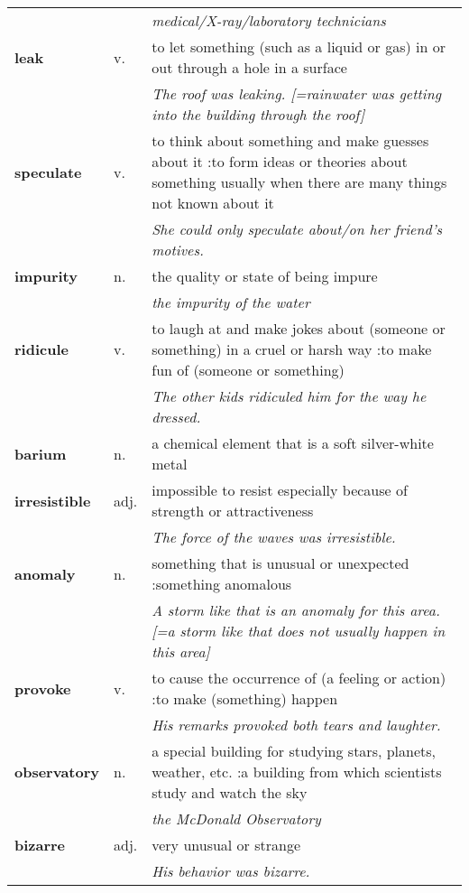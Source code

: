 \documentclass[a4paper]{article}
\begin{document}
\begin{longtable}{llp{11cm}}
 & & \textit{medical/X-ray/laboratory technicians}\\[0.08cm]
\textbf{leak} & v. &  to let something (such as a liquid or gas) in or out through a hole in a surface \\
 & & \textit{The roof was leaking. [=rainwater was getting into the building through the roof]}\\[0.08cm]
\textbf{speculate} & v. &  to think about something and make guesses about it :to form ideas or theories about something usually when there are many things not known about it \\
 & & \textit{She could only speculate about/on her friend's motives.}\\[0.08cm]
\textbf{impurity} & n. &  the quality or state of being impure \\
 & & \textit{the impurity of the water}\\[0.08cm]
\textbf{ridicule} & v. &  to laugh at and make jokes about (someone or something) in a cruel or harsh way :to make fun of (someone or something) \\
 & & \textit{The other kids ridiculed him for the way he dressed.}\\[0.08cm]
\textbf{barium} & n. &  a chemical element that is a soft silver-white metal\\[0.08cm]
\textbf{irresistible} & adj. &  impossible to resist especially because of strength or attractiveness \\
 & & \textit{The force of the waves was irresistible.}\\[0.08cm]
\textbf{anomaly} & n. &  something that is unusual or unexpected :something anomalous \\
 & & \textit{A storm like that is an anomaly for this area. [=a storm like that does not usually happen in this area]}\\[0.08cm]
\textbf{provoke} & v. &  to cause the occurrence of (a feeling or action) :to make (something) happen \\
 & & \textit{His remarks provoked both tears and laughter.}\\[0.08cm]
\textbf{observatory} & n. &  a special building for studying stars, planets, weather, etc. :a building from which scientists study and watch the sky \\
 & & \textit{the McDonald Observatory}\\[0.08cm]
\textbf{bizarre} & adj. &  very unusual or strange \\
 & & \textit{His behavior was bizarre.}\\[0.08cm]

\end{longtable}
\end{document}
